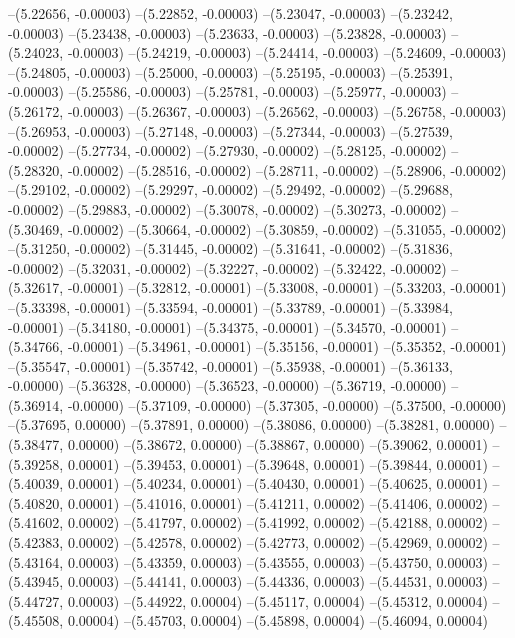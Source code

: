 --(5.22656, -0.00003)
--(5.22852, -0.00003)
--(5.23047, -0.00003)
--(5.23242, -0.00003)
--(5.23438, -0.00003)
--(5.23633, -0.00003)
--(5.23828, -0.00003)
--(5.24023, -0.00003)
--(5.24219, -0.00003)
--(5.24414, -0.00003)
--(5.24609, -0.00003)
--(5.24805, -0.00003)
--(5.25000, -0.00003)
--(5.25195, -0.00003)
--(5.25391, -0.00003)
--(5.25586, -0.00003)
--(5.25781, -0.00003)
--(5.25977, -0.00003)
--(5.26172, -0.00003)
--(5.26367, -0.00003)
--(5.26562, -0.00003)
--(5.26758, -0.00003)
--(5.26953, -0.00003)
--(5.27148, -0.00003)
--(5.27344, -0.00003)
--(5.27539, -0.00002)
--(5.27734, -0.00002)
--(5.27930, -0.00002)
--(5.28125, -0.00002)
--(5.28320, -0.00002)
--(5.28516, -0.00002)
--(5.28711, -0.00002)
--(5.28906, -0.00002)
--(5.29102, -0.00002)
--(5.29297, -0.00002)
--(5.29492, -0.00002)
--(5.29688, -0.00002)
--(5.29883, -0.00002)
--(5.30078, -0.00002)
--(5.30273, -0.00002)
--(5.30469, -0.00002)
--(5.30664, -0.00002)
--(5.30859, -0.00002)
--(5.31055, -0.00002)
--(5.31250, -0.00002)
--(5.31445, -0.00002)
--(5.31641, -0.00002)
--(5.31836, -0.00002)
--(5.32031, -0.00002)
--(5.32227, -0.00002)
--(5.32422, -0.00002)
--(5.32617, -0.00001)
--(5.32812, -0.00001)
--(5.33008, -0.00001)
--(5.33203, -0.00001)
--(5.33398, -0.00001)
--(5.33594, -0.00001)
--(5.33789, -0.00001)
--(5.33984, -0.00001)
--(5.34180, -0.00001)
--(5.34375, -0.00001)
--(5.34570, -0.00001)
--(5.34766, -0.00001)
--(5.34961, -0.00001)
--(5.35156, -0.00001)
--(5.35352, -0.00001)
--(5.35547, -0.00001)
--(5.35742, -0.00001)
--(5.35938, -0.00001)
--(5.36133, -0.00000)
--(5.36328, -0.00000)
--(5.36523, -0.00000)
--(5.36719, -0.00000)
--(5.36914, -0.00000)
--(5.37109, -0.00000)
--(5.37305, -0.00000)
--(5.37500, -0.00000)
--(5.37695, 0.00000)
--(5.37891, 0.00000)
--(5.38086, 0.00000)
--(5.38281, 0.00000)
--(5.38477, 0.00000)
--(5.38672, 0.00000)
--(5.38867, 0.00000)
--(5.39062, 0.00001)
--(5.39258, 0.00001)
--(5.39453, 0.00001)
--(5.39648, 0.00001)
--(5.39844, 0.00001)
--(5.40039, 0.00001)
--(5.40234, 0.00001)
--(5.40430, 0.00001)
--(5.40625, 0.00001)
--(5.40820, 0.00001)
--(5.41016, 0.00001)
--(5.41211, 0.00002)
--(5.41406, 0.00002)
--(5.41602, 0.00002)
--(5.41797, 0.00002)
--(5.41992, 0.00002)
--(5.42188, 0.00002)
--(5.42383, 0.00002)
--(5.42578, 0.00002)
--(5.42773, 0.00002)
--(5.42969, 0.00002)
--(5.43164, 0.00003)
--(5.43359, 0.00003)
--(5.43555, 0.00003)
--(5.43750, 0.00003)
--(5.43945, 0.00003)
--(5.44141, 0.00003)
--(5.44336, 0.00003)
--(5.44531, 0.00003)
--(5.44727, 0.00003)
--(5.44922, 0.00004)
--(5.45117, 0.00004)
--(5.45312, 0.00004)
--(5.45508, 0.00004)
--(5.45703, 0.00004)
--(5.45898, 0.00004)
--(5.46094, 0.00004)
